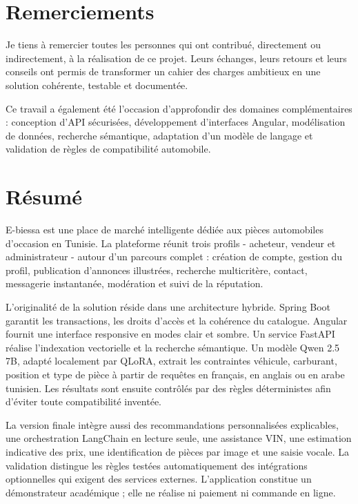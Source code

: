 \chapter*{Remerciements}

Je tiens à remercier toutes les personnes qui ont contribué, directement ou indirectement, à la réalisation de ce projet. Leurs échanges, leurs retours et leurs conseils ont permis de transformer un cahier des charges ambitieux en une solution cohérente, testable et documentée.


Ce travail a également été l'occasion d'approfondir des domaines complémentaires : conception d'API sécurisées, développement d'interfaces Angular, modélisation de données, recherche sémantique, adaptation d'un modèle de langage et validation de règles de compatibilité automobile.


\chapter*{Résumé}

E-biessa est une place de marché intelligente dédiée aux pièces automobiles d'occasion en Tunisie. La plateforme réunit trois profils - acheteur, vendeur et administrateur - autour d'un parcours complet : création de compte, gestion du profil, publication d'annonces illustrées, recherche multicritère, contact, messagerie instantanée, modération et suivi de la réputation.


L'originalité de la solution réside dans une architecture hybride. Spring Boot garantit les transactions, les droits d'accès et la cohérence du catalogue. Angular fournit une interface responsive en modes clair et sombre. Un service FastAPI réalise l'indexation vectorielle et la recherche sémantique. Un modèle Qwen 2.5 7B, adapté localement par QLoRA, extrait les contraintes véhicule, carburant, position et type de pièce à partir de requêtes en français, en anglais ou en arabe tunisien. Les résultats sont ensuite contrôlés par des règles déterministes afin d'éviter toute compatibilité inventée.


La version finale intègre aussi des recommandations personnalisées explicables, une orchestration LangChain en lecture seule, une assistance VIN, une estimation indicative des prix, une identification de pièces par image et une saisie vocale. La validation distingue les règles testées automatiquement des intégrations optionnelles qui exigent des services externes. L'application constitue un démonstrateur académique ; elle ne réalise ni paiement ni commande en ligne.


